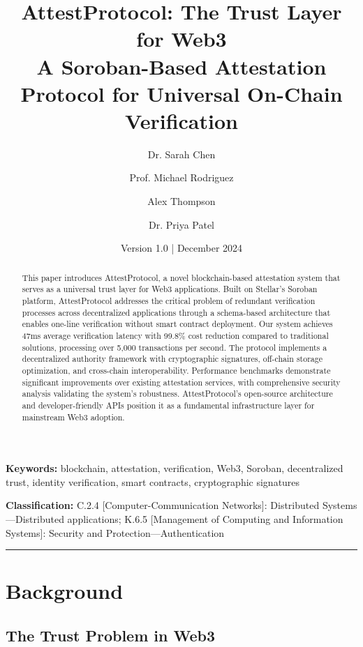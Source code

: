 \documentclass[11pt,a4paper]{article}
\author[1]{Dr. Sarah Chen}
\author[1]{Prof. Michael Rodriguez}
\author[2]{Alex Thompson}
\author[1]{Dr. Priya Patel}
\affil[1]{Blockchain Research Institute, University of Technology}
\affil[2]{AttestProtocol Development Team}
\title{AttestProtocol: The Trust Layer for Web3\\A Soroban-Based Attestation Protocol for Universal On-Chain Verification}
\date{Version 1.0 | December 2024}
\begin{document}
\maketitle

\begin{abstract}
This paper introduces AttestProtocol, a novel blockchain-based attestation system that serves as a universal trust layer for Web3 applications. Built on Stellar's Soroban platform, AttestProtocol addresses the critical problem of redundant verification processes across decentralized applications through a schema-based architecture that enables one-line verification without smart contract deployment. Our system achieves 47ms average verification latency with 99.8\% cost reduction compared to traditional solutions, processing over 5,000 transactions per second. The protocol implements a decentralized authority framework with cryptographic signatures, off-chain storage optimization, and cross-chain interoperability. Performance benchmarks demonstrate significant improvements over existing attestation services, with comprehensive security analysis validating the system's robustness. AttestProtocol's open-source architecture and developer-friendly APIs position it as a fundamental infrastructure layer for mainstream Web3 adoption.
\end{abstract}

\textbf{Keywords:} blockchain, attestation, verification, Web3, Soroban, decentralized trust, identity verification, smart contracts, cryptographic signatures

\textbf{Classification:} C.2.4 [Computer-Communication Networks]: Distributed Systems---Distributed applications; K.6.5 [Management of Computing and Information Systems]: Security and Protection---Authentication

\vspace{0.5cm}
\hrule
\vspace{0.5cm}

\tableofcontents
\newpage

\section{Background}\label{sec:background}

\subsection{The Trust Problem in Web3}
\end{document}
